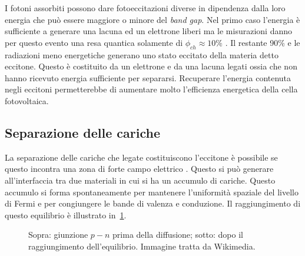 I fotoni assorbiti possono dare fotoeccitazioni diverse in dipendenza dalla loro energia che può essere maggiore o minore del \emph{band gap}. Nel primo caso l'energia è sufficiente a generare una lacuna ed un elettrone liberi ma le misurazioni danno per questo evento una resa quantica solamente di $\phi_{ch}\approx10\%$ \cite{pol-polarons}. Il restante 90\% e le radiazioni meno energetiche generano uno stato eccitato della materia detto eccitone. Questo è costituito da un elettrone e da una lacuna legati ossia che non hanno ricevuto energia sufficiente per separarsi. Recuperare l'energia contenuta negli eccitoni permetterebbe di aumentare molto l'efficienza energetica della cella fotovoltaica.
\subsection{Separazione delle cariche}
La separazione delle cariche che legate costituiscono l'eccitone è possibile se questo incontra una zona di forte campo elettrico \cite{fv-pcbm}. Questo si può generare all'interfaccia tra due materiali in cui si ha un accumulo di cariche. Questo accumulo si forma spontaneamente per mantenere l'uniformità spaziale del livello di Fermi  e per congiungere le bande di valenza e conduzione.
Il raggiungimento di questo equilibrio è illustrato in~\ref{fig:depletion_layer}.
\begin{figure}
\caption{\footnotesize{Sopra: giunzione $p-n$ prima della diffusione; sotto: dopo il raggiungimento dell'equilibrio. Immagine tratta da Wikimedia.}
\label{fig:depletion_layer}}
\end{figure}
